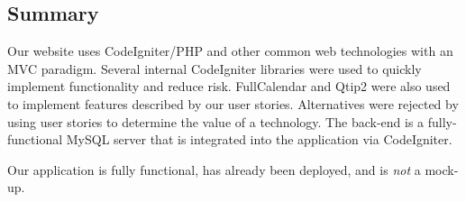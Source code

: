 \documentclass[12pt]{article}
\begin{document}
\subsection{Summary}

Our website uses CodeIgniter/PHP and other common web technologies with an MVC paradigm. Several internal CodeIgniter libraries were used to quickly implement functionality and reduce risk. FullCalendar and Qtip2 were also used to implement features described by our user stories. Alternatives were rejected by using user stories to determine the value of a technology. The back-end is a fully-functional MySQL server that is integrated into the application via CodeIgniter.

Our application is fully functional, has already been deployed, and is \textit{not} a mock-up.
\end{document}
